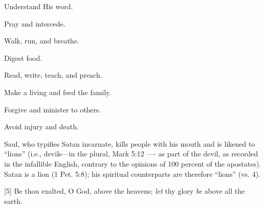 {\begin{compactenum}
    \item Understand His word.
    \item Pray and intercede.
    \item Walk, run, and breathe.
    \item Digest food.
    \item Read, write, teach, and preach.
    \item Make a living and feed the family.
    \item Forgive and minister to others.
    \item Avoid injury and death.
\end{compactenum}
Saul, who typifies Satan incarnate, kills people with his mouth and is likened to
“lions” (i.e., devils—in the plural, Mark 5:12 —- as part of the devil, as recorded in the infallible English, contrary to the opinions of 100 percent of the apostates). Satan is a lion (1 Pet. 5:8); his spiritual counterparts are therefore “lions” (vs. 4). }
[5] \textcolor[rgb]{0.00,0.00,1.00}{Be thou exalted, O God, above the heavens; \emph{let} thy glory \emph{be} above all the earth.}
